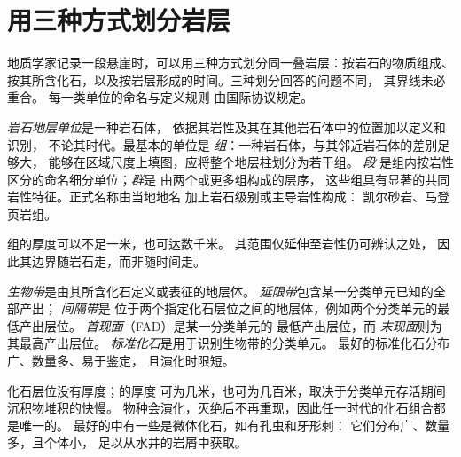 \section{用三种方式划分岩层}\label{sec:b1:stratigraphic-scale:three}

地质学家记录一段悬崖时，可以用三种方式划分同一叠岩层：按岩石的物质组成、
按其所含化石，以及按岩层形成的时间。三种划分回答的问题不同，
其界线未必重合。
每一类单位的命名与定义规则
由国际协议规定。

\begin{definition}[组、段、群]\label{def:b1:stratigraphic-scale:lithostratigraphy}
\emph{岩石地层单位}是一种岩石体，
依据其岩性及其在其他岩石体中的位置加以定义和识别，
不论其时代。最基本的单位是
\emph{组}：一种岩石体，与其邻近岩石体的差别足够大，
能够在区域尺度上填图，应将整个地层柱划分为若干组。
\emph{段}
是组内按岩性区分的命名细分单位；\emph{群}是
由两个或更多组构成的层序，
这些组具有显著的共同岩性特征。正式名称由当地地名
加上岩石级别或主导岩性构成：
凯尔砂岩、马登页岩组。
\end{definition}

组的厚度可以不足一米，也可达数千米。
其范围仅延伸至岩性仍可辨认之处，
因此其边界随岩石走，而非随时间走。

\begin{definition}\label{def:b1:stratigraphic-scale:biozone}
\emph{生物带}是由其所含化石定义或表征的地层体。
\emph{延限带}包含某一分类单元已知的全部产出；
\emph{间隔带}是
位于两个指定化石层位之间的地层体，例如两个分类单元的最低产出层位。
\emph{首现面}（FAD）是某一分类单元的
最低产出层位，而
\emph{末现面}则为其最高产出层位。
\emph{标准化石}是用于识别生物带的分类单元。
最好的标准化石分布广、数量多、易于鉴定，
且演化时限短。
\end{definition}

化石层位没有厚度；的厚度
可为几米，也可为几百米，取决于分类单元存活期间沉积物堆积的快慢。
物种会演化，灭绝后不再重现，因此任一时代的化石组合都是唯一的。
最好的中有一些是微体化石，如有孔虫和牙形刺：
它们分布广、数量多，且个体小，
足以从水井的岩屑中获取。

